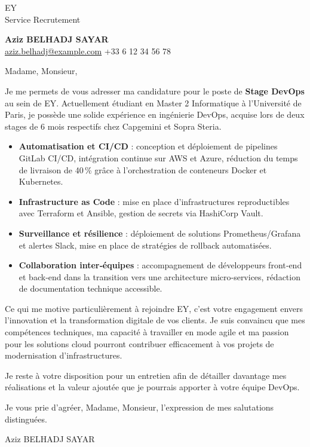 \documentclass[11pt,a4paper]{letter}
\makeatletter
\newcommand{\CandidateName}{Aziz BELHADJ SAYAR}
\newcommand{\CandidateEmail}{\href{mailto:aziz.belhadj@example.com}{aziz.belhadj@example.com}}
\newcommand{\CandidatePhone}{+33 6 12 34 56 78}
\newcommand{\CompanyName}{EY}
\newcommand{\Position}{Stage DevOps}
\makeatother
\begin{document}
\begin{letter}{\textcolor{header}{\CompanyName} \\
Service Recrutement}

\begin{center}
\textbf{\Large \CandidateName} \\
\textcolor{accent}{\CandidateEmail} \hspace{2em} \textcolor{accent}{\CandidatePhone}
\end{center}

\vspace{1em}

\opening{Madame, Monsieur,}

Je me permets de vous adresser ma candidature pour le poste de \textbf{\Position} au sein de \CompanyName. Actuellement étudiant en Master 2 Informatique à l’Université de Paris, je possède une solide expérience en ingénierie DevOps, acquise lors de deux stages de 6 mois respectifs chez \textcolor{accent}{Capgemini} et \textcolor{accent}{Sopra Steria}.

\begin{itemize}[leftmargin=*,labelsep=1em]
  \item \textbf{Automatisation et CI/CD} : conception et déploiement de pipelines GitLab CI/CD, intégration continue sur AWS et Azure, réduction du temps de livraison de 40 \% grâce à l’orchestration de conteneurs Docker et Kubernetes.
  \item \textbf{Infrastructure as Code} : mise en place d’infrastructures reproductibles avec Terraform et Ansible, gestion de secrets via HashiCorp Vault.
  \item \textbf{Surveillance et résilience} : déploiement de solutions Prometheus/Grafana et alertes Slack, mise en place de stratégies de rollback automatisées.
  \item \textbf{Collaboration inter‑équipes} : accompagnement de développeurs front‑end et back‑end dans la transition vers une architecture micro‑services, rédaction de documentation technique accessible.
\end{itemize}

Ce qui me motive particulièrement à rejoindre \CompanyName, c’est votre engagement envers l’innovation et la transformation digitale de vos clients. Je suis convaincu que mes compétences techniques, ma capacité à travailler en mode agile et ma passion pour les solutions cloud pourront contribuer efficacement à vos projets de modernisation d’infrastructures.

Je reste à votre disposition pour un entretien afin de détailler davantage mes réalisations et la valeur ajoutée que je pourrais apporter à votre équipe DevOps.

Je vous prie d’agréer, Madame, Monsieur, l’expression de mes salutations distinguées.

\closing{\CandidateName}

\end{letter}
\end{document}
